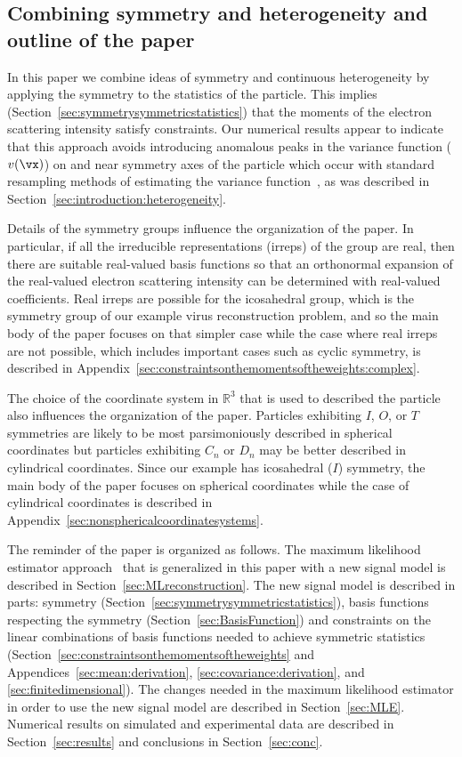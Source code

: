 \subsection{Combining symmetry and heterogeneity and outline of the paper}
\label{sec:combiningsymmetryandheterogeneity}
\label{sec:outline}
In this paper we combine ideas of symmetry and continuous
heterogeneity by applying the symmetry to the statistics of the particle.
This implies (Section~\ref{sec:symmetrysymmetricstatistics})
that the moments of the electron scattering intensity satisfy constraints.
Our numerical results appear to indicate that this approach avoids
introducing anomalous peaks in the variance function ($v(\vx)$) on and
near symmetry axes of the particle which occur with standard resampling
methods of estimating the variance
function~\cite[p.~173]{Ludtke.MethodsEnzymology.2016}, as was described in
Section~\ref{sec:introduction:heterogeneity}.
\par
Details of the symmetry groups influence the organization of the paper.
In particular, if all the irreducible representations (irreps) of the group
are real, then there are suitable real-valued basis functions so that an
orthonormal expansion of the real-valued electron scattering intensity can be
determined with real-valued coefficients.
Real irreps are possible for the icosahedral group, which is the symmetry
group of our example virus reconstruction problem, and so the main body of
the paper focuses on that simpler case while the case where real irreps are
not possible, which includes important cases such as cyclic symmetry, is
described in Appendix~\ref{sec:constraintsonthemomentsoftheweights:complex}.
\par
The choice of the coordinate system in $\mathbb{R}^3$ that is used to described
the particle also influences the organization of the paper.
Particles exhibiting $I$, $O$, or $T$ symmetries are likely to be most
parsimoniously described in spherical coordinates but particles exhibiting
$C_n$ or $D_n$ may be better described in cylindrical coordinates.
Since our example has icosahedral ($I$) symmetry, the main body of the
paper focuses on spherical coordinates while the case of cylindrical
coordinates is described in Appendix~\ref{sec:nonsphericalcoordinatesystems}.
\par
The reminder of the paper is organized as follows.
The maximum likelihood estimator
approach~\cite{YiliZhengQiuWangDoerschukJOSA2012} that is generalized in
this paper with a new signal model is described in
Section~\ref{sec:MLreconstruction}.
The new signal model is described in parts:
symmetry (Section~\ref{sec:symmetrysymmetricstatistics}),
basis functions respecting the symmetry (Section~\ref{sec:BasisFunction})
and
constraints on the linear combinations of basis functions needed to achieve
symmetric statistics (Section~\ref{sec:constraintsonthemomentsoftheweights}
and Appendices~\ref{sec:mean:derivation}, \ref{sec:covariance:derivation}, and
\ref{sec:finitedimensional}).
The changes needed in the maximum likelihood estimator in order
to use the new signal model are described in Section~\ref{sec:MLE}.
Numerical results on simulated and experimental data are described in
Section~\ref{sec:results} and conclusions in Section~\ref{sec:conc}.
